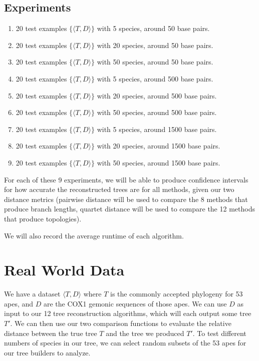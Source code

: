 \documentclass[11pt]{article}
\begin{document}
\subsection*{Experiments}
\begin{enumerate}
  \item 20 test examples $\{\langle T, D \rangle\}$ with 5 species, around 50 base pairs.
  \item 20 test examples $\{\langle T, D \rangle\}$ with 20 species, around 50 base pairs.
  \item 20 test examples $\{\langle T, D \rangle\}$ with 50 species, around 50 base pairs.
  \item 20 test examples $\{\langle T, D \rangle\}$ with 5 species, around 500 base pairs.
  \item 20 test examples $\{\langle T, D \rangle\}$ with 20 species, around 500 base pairs.
  \item 20 test examples $\{\langle T, D \rangle\}$ with 50 species, around 500 base pairs.
  \item 20 test examples $\{\langle T, D \rangle\}$ with 5 species, around 1500 base pairs.
  \item 20 test examples $\{\langle T, D \rangle\}$ with 20 species, around 1500 base pairs.
  \item 20 test examples $\{\langle T, D \rangle\}$ with 50 species, around 1500 base pairs.
\end{enumerate}

For each of these 9 experiments, we will be able to produce confidence intervals for how
accurate the reconstructed trees are for all methods, given our two distance metrics
(pairwise distance will be used to compare the 8 methods that produce branch lengths,
quartet distance will be used to compare the 12 methods that produce topologies).

We will also record the average runtime of each algorithm.

\section*{Real World Data}
We have a dataset $\langle T, D \rangle$ where $T$ is the commonly accepted phylogeny
for 53 apes, and $D$ are the COX1 gemonic sequences of those apes. We can use $D$ as input
to our 12 tree reconstruction algorithms, which will each output some tree $T'$. We can then use
our two comparison functions to evaluate the relative distance between the true tree $T$ and
the tree we produced $T'$. To test different numbers of species in our tree, we can
select random subsets of the 53 apes for our tree builders to analyze.
\end{document}
